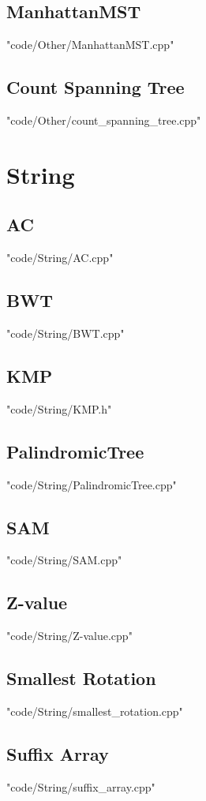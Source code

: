 \subsection{ManhattanMST}
 {"code/Other/ManhattanMST.cpp"}
\subsection{Count Spanning Tree}
 {"code/Other/count_spanning_tree.cpp"}
\section{String}
\subsection{AC}
 {"code/String/AC.cpp"}
\subsection{BWT}
 {"code/String/BWT.cpp"}
\subsection{KMP}
 {"code/String/KMP.h"}
\subsection{PalindromicTree}
 {"code/String/PalindromicTree.cpp"}
\subsection{SAM}
 {"code/String/SAM.cpp"}
\subsection{Z-value}
 {"code/String/Z-value.cpp"}
\subsection{Smallest Rotation}
 {"code/String/smallest_rotation.cpp"}
\subsection{Suffix Array}
 {"code/String/suffix_array.cpp"}




